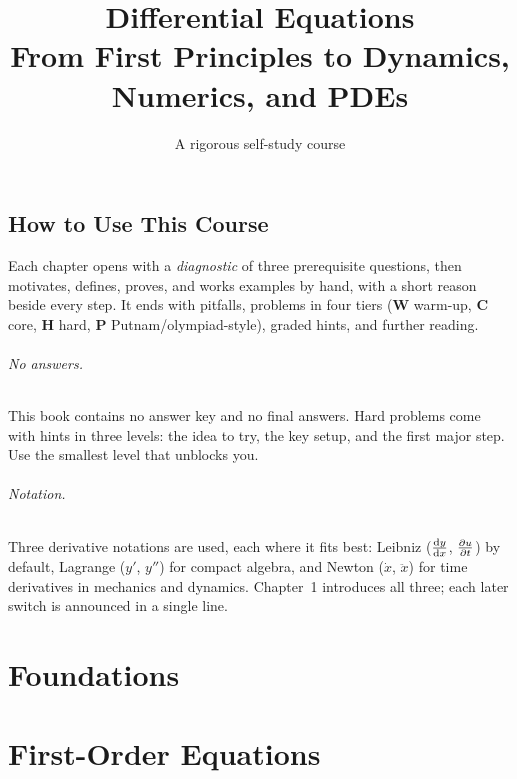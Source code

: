 \documentclass[11pt, oneside, openany]{book}
\title{Differential Equations\\[0.5ex]
  \large From First Principles to Dynamics, Numerics, and PDEs}
\author{A rigorous self-study course}
\date{}
\begin{document}
\frontmatter
\maketitle

\chapter*{How to Use This Course}

Each chapter opens with a \emph{diagnostic} of three prerequisite questions,
then motivates, defines, proves, and works examples by hand, with a short
reason beside every step. It ends with pitfalls, problems in four tiers
(\textbf{W} warm-up, \textbf{C} core, \textbf{H} hard, \textbf{P}
Putnam/olympiad-style), graded hints, and further reading.

\paragraph{No answers.} This book contains no answer key and no final answers.
Hard problems come with hints in three levels: the idea to try, the key setup,
and the first major step. Use the smallest level that unblocks you.

\paragraph{Notation.} Three derivative notations are used, each where it fits
best: Leibniz ($\frac{\mathrm{d}y}{\mathrm{d}x}$, $\frac{\partial u}{\partial t}$) by default, Lagrange ($y'$,
$y''$) for compact algebra, and Newton ($\dot{x}$, $\ddot{x}$) for time
derivatives in mechanics and dynamics. Chapter~1 introduces all three; each
later switch is announced in a single line.

\tableofcontents

\mainmatter

\setcounter{chapter}{-1}


\part{Foundations}



\part{First-Order Equations}






\end{document}
